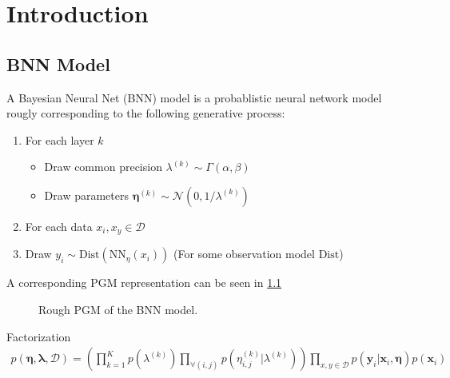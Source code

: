 \chapter{Introduction}

\section{BNN Model}

A Bayesian Neural Net (BNN) model is a probablistic neural network model rougly corresponding to the following generative process:
\begin{enumerate}
    \item For each layer $k$
    \begin{itemize}
        \item Draw common precision $\lambda^{(k)}\sim \Gamma(\alpha, \beta)$
        \item Draw parameters $\bm\eta^{(k)} \sim \mathcal N(0, 1/\lambda^{(k)})$
    \end{itemize}
    \item For each data $x_i, x_y \in \mathcal D$
    \item Draw $y_i \sim \text{Dist}(\text{NN}_\eta(x_i))$ (For some observation model $\text{Dist}$)
\end{enumerate}
A corresponding PGM representation can be seen in \cref{bnn-pgm} 

\begin{figure}[htbp]
    \centering
    \caption{Rough PGM of the BNN model.}
    \label{bnn-pgm}
    
\end{figure}
Factorization
\begin{align*}
    p(\bm \eta, \bm \lambda, \mathcal D) = \left(\prod_{k=1}^K  p(\lambda^{(k)}) \prod_{\forall (i,j)} p(\eta_{i,j}^{(k)}|\lambda^{(k)})  \right) 
    \prod_{x, y\in \mathcal D} p(\bm y_i | \bm x_i, \bm \eta) p(\bm x_i)
\end{align*}


